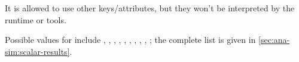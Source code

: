 It is allowed to use other keys/attributes, but they won't be interpreted
by the {\opp} runtime or tools.

Possible values for  include , , ,
, , , , , ,
; the complete list is given in \ref{sec:ana-sim:scalar-results}.


%
%
%
%
%


